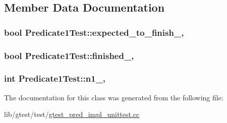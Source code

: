 \subsection{Member Data Documentation}
\hypertarget{class_predicate1_test_ad91cfa58e6352d53abacce32df2ef635}{
\subsubsection[{expected\-\_\-to\-\_\-finish\-\_\-}]{\setlength{\rightskip}{0pt plus 5cm}bool Predicate1\-Test\-::expected\-\_\-to\-\_\-finish\-\_\-\hspace{0.3cm}{\ttfamily [static]}, {\ttfamily [protected]}}}\label{class_predicate1_test_ad91cfa58e6352d53abacce32df2ef635}
\hypertarget{class_predicate1_test_a6d45fb2d1f01a5c8baf28f60039c244e}{
\subsubsection[{finished\-\_\-}]{\setlength{\rightskip}{0pt plus 5cm}bool Predicate1\-Test\-::finished\-\_\-\hspace{0.3cm}{\ttfamily [static]}, {\ttfamily [protected]}}}\label{class_predicate1_test_a6d45fb2d1f01a5c8baf28f60039c244e}
\hypertarget{class_predicate1_test_a528d9f7f618b17802962a3824eea11e3}{
\subsubsection[{n1\-\_\-}]{\setlength{\rightskip}{0pt plus 5cm}int Predicate1\-Test\-::n1\-\_\-\hspace{0.3cm}{\ttfamily [static]}, {\ttfamily [protected]}}}\label{class_predicate1_test_a528d9f7f618b17802962a3824eea11e3}


The documentation for this class was generated from the following file\-:\begin{DoxyCompactItemize}
\item 
lib/gtest/test/\hyperlink{gtest__pred__impl__unittest_8cc}{gtest\-\_\-pred\-\_\-impl\-\_\-unittest.\-cc}\end{DoxyCompactItemize}
